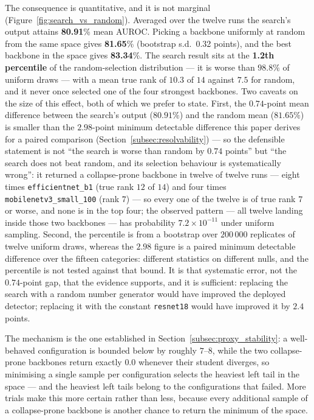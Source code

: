 The consequence is quantitative, and it is not marginal
(Figure~\ref{fig:search_vs_random}). Averaged over the twelve
runs the search's output attains \textbf{80.91}\% mean AUROC. Picking a backbone
uniformly at random from the same space gives \textbf{81.65}\% (bootstrap
s.d.\ 0.32 points), and the best backbone in the space gives \textbf{83.34}\%.
The search result sits at the \textbf{1.2th percentile} of the random-selection
distribution --- it is worse than $98.8\%$ of uniform draws --- with a mean true
rank of $10.3$ of $14$ against $7.5$ for random, and it never once selected one of
the four strongest backbones. Two caveats on the size of this effect, both of
which we prefer to state. First, the $0.74$-point mean difference between the
search's output ($80.91\%$) and the random mean ($81.65\%$) is smaller than the
$2.98$-point minimum detectable difference this paper derives for a paired
comparison
(Section~\ref{subsec:resolvability}) --- so the defensible statement is not ``the
search is worse than random by $0.74$ points'' but ``the search does not beat
random, and its selection behaviour is systematically wrong'': it returned a
collapse-prone backbone in twelve of twelve runs --- eight times
\texttt{efficientnet\_b1} (true rank $12$ of $14$) and four times
\texttt{mobilenetv3\_small\_100} (rank $7$) --- so every one of the twelve is of
true rank $7$ or worse, and none is in the top four; the observed pattern --- all
twelve landing inside those two backbones --- has probability $7.2\times10^{-11}$
under uniform sampling. Second, the percentile is from a bootstrap over
$200\,000$ replicates of twelve uniform draws, whereas the $2.98$ figure is a
paired minimum detectable difference over the fifteen categories: different
statistics on different nulls, and the percentile is not tested against that
bound. It is that
systematic error, not the $0.74$-point gap, that the evidence supports, and it is
sufficient: replacing the search with a random number generator would have
improved the deployed detector; replacing it with the constant
\texttt{resnet18} would have improved it by $2.4$ points.

The mechanism is the one established in Section~\ref{subsec:proxy_stability}: a
well-behaved configuration is bounded below by roughly $7$--$8$, while the two
collapse-prone backbones return exactly $0.0$ whenever their student diverges, so
minimising a single sample per configuration selects the heaviest left tail in the
space --- and the heaviest left tails belong to the configurations that failed.
More trials make this more certain rather than less, because every additional
sample of a collapse-prone backbone is another chance to return the minimum of the
space.

